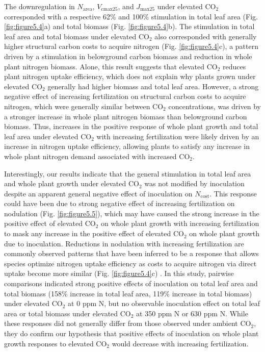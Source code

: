 The downregulation in $N_\mathrm{area}$, $V_\mathrm{cmax25}$, and $J_\mathrm{max25}$ under elevated CO$_2$ corresponded with a respective 62\% and 100\% stimulation in total leaf area (Fig. \ref{fig:figure5.4}a) and total biomass (Fig. \ref{fig:figure5.4}b). The stimulation in total leaf area and total biomass under elevated CO$_2$ also corresponded with generally higher structural carbon costs to acquire nitrogen (Fig. \ref{fig:figure5.4}c), a pattern driven by a stimulation in belowground carbon biomass and reduction in whole plant nitrogen biomass. Alone, this result suggests that elevated CO$_2$ reduces plant nitrogen uptake efficiency, which does not explain why plants grown under elevated CO$_2$ generally had higher biomass and total leaf area. However, a strong negative effect of increasing fertilization on structural carbon costs to acquire nitrogen, which were generally similar between CO$_2$ concentrations, was driven by a stronger increase in whole plant nitrogen biomass than belowground carbon biomass. Thus, increases in the positive response of whole plant growth and total leaf area under elevated CO$_2$ with increasing fertilization were likely driven by an increase in nitrogen uptake efficiency, allowing plants to satisfy any increase in whole plant nitrogen demand associated with increased CO$_2$.

Interestingly, our results indicate that the general stimulation in total leaf area and whole plant growth under elevated CO$_2$ was not modified by inoculation despite an apparent general negative effect of inoculation on $N_\mathrm{cost}$. This response could have been due to strong negative effect of increasing fertilization on nodulation (Fig. \ref{fig:figure5.5}), which may have caused the strong increase in the positive effect of elevated CO$_2$ on whole plant growth with increasing fertilization to mask any increase in the positive effect of elevated CO$_2$ on whole plant growth due to inoculation. Reductions in nodulation with increasing fertilization are commonly observed patterns that have been inferred to be a response that allows species optimize nitrogen uptake efficiency as costs to acquire nitrogen via direct uptake become more similar (Fig. \ref{fig:figure5.4}c) . In this study, pairwise comparisons indicated strong positive effects of inoculation on total leaf area and total biomass (158\% increase in total leaf area, 119\% increase in total biomass) under elevated CO$_2$ at 0 ppm N, but no observable inoculation effect on total leaf area or total biomass under elevated CO$_2$ at 350 ppm N or 630 ppm N. While these responses did not generally differ from those observed under ambient CO$_2$, they do confirm our hypothesis that positive effects of inoculation on whole plant growth responses to elevated CO$_2$ would decrease with increasing fertilization.

